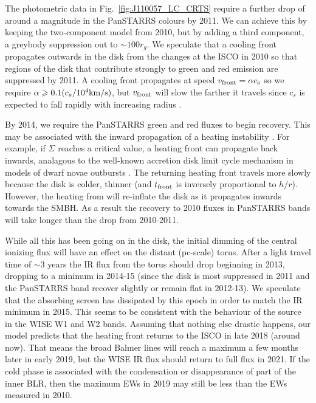 \documentclass[a4paper,fleqn,usenatbib]{mnras}
\begin{document}
The photometric data in Fig.~\ref{fig:J110057_LC_CRTS} require a further drop of around a magnitude in the PanSTARRS colours by 2011. We can achieve this by keeping the two-component model from 2010, but by adding a third component, a greybody suppression out to $\sim 100r_{g}$. We speculate that a cooling front propagates outwards in the disk from the changes at the ISCO in 2010 so that regions of the disk that contribute strongly to green and red emission are suppressed by 2011. A cooling front propagates at speed $v_{\rm front}=\alpha c_{\rm s}$ \citep{Hameury2009} so we require $\alpha \geq 0.1(c_{s}/10^{4}{\rm km/s})$, but $v_{\rm front}$ will slow the farther it travels since $c_{s}$ is expected to fall rapidly with increasing radius \citep{Sirko_Goodman2003}. 

By 2014, we require the PanSTARRS green and red fluxes to begin recovery. This may be associated with the inward propagation of a heating instability \citep{Hameury2009}. For example, if $\Sigma$ reaches a critical value, a heating front can propagate back inwards,
analagous to the well-known accretion disk limit cycle mechanism in models of dwarf novae outbursts \citep[e.g.,][]{Cannizzo1998}. The
returning heating front travels more slowly because the disk is colder, thinner (and $t_{\rm front}$ is inversely proportional to $h/r$). However, the heating from will re-inflate the disk as it propagates inwards towards the SMBH. As a result the recovery to 2010 fluxes in PanSTARRS bands will take longer than the drop from 2010-2011. 

While all this has been going on in the disk, the initial dimming of the central ionizing flux will have an effect on the distant (pc-scale) torus. After a light travel time of $\sim 3$ years the IR flux from the torus should drop \citep{Koshida2014, Jun2015} beginning in 2013, dropping to a minimum in 2014-15 (since the disk is most suppressed in 2011 and the PanSTARRS band recover slightly or remain flat in 2012-13). We speculate that the absorbing screen has dissipated by this epoch in order to match the IR minimum in 2015. This seems to be consistent with the behaviour of the source in the WISE W1 and W2 bands. Assuming that nothing else drastic happens, our model predicts that the heating front returns to the ISCO in late 2018 (around now). That means the broad Balmer lines will reach a maximum a few months later in early 2019, but the WISE IR flux should return to full flux in 2021. If the cold phase is associated with the condensation or disappearance of part of the inner BLR, then the maximum EWs in 2019 may still be less than the EWs measured in 2010.
\end{document}
